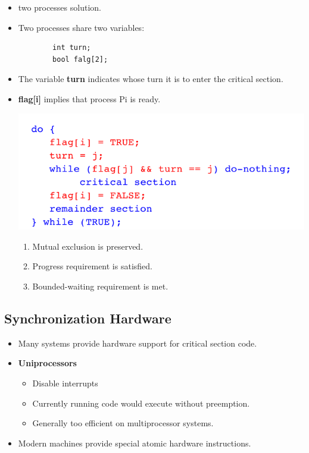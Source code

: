 \documentclass[10pt]{article}
\newcommand{\tf}{\textbf}
\begin{document}
\begin{itemize}
	\item two processes solution.
	\item Two processes share two variables:
	\begin{verbatim}
		int turn;
		bool falg[2]; 
	\end{verbatim}

	\item The variable \tf{turn} indicates whose turn it is to enter the critical section.
	\item \tf{flag[i]} implies that process Pi is ready.
	
	\bigbreak
	\includegraphics[scale = 0.7]{peterson.png}
	\bigbreak

	\begin{enumerate}
		\item Mutual exclusion is preserved.
		\item Progress requirement is satisfied.
		\item Bounded-waiting requirement is met.
	\end{enumerate}
\end{itemize}

\subsection{Synchronization Hardware}

\begin{itemize}
	\item Many systems provide hardware support for critical section code.
	\item \tf{Uniprocessors}
	\begin{itemize}
		\item Disable interrupts
		\item Currently running code would execute without preemption.
		\item Generally too efficient on multiprocessor systems.
	\end{itemize}

	\item Modern machines provide special atomic hardware instructions.
\end{itemize}
\end{document}
